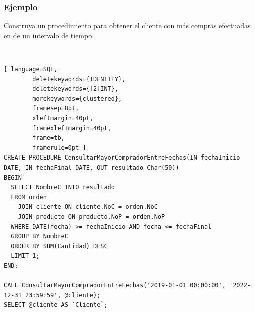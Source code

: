 \documentclass[
	10pt, %
	aspectratio=169, %
]{beamer}
\begin{document}
\begin{frame}[fragile]
	
	\frametitle{Ejemplo}
	
	Construya un procedimiento para obtener el cliente con más compras efectuadas en de un intervalo de tiempo.
	
	\ 
	
	
	\pause
	
	\begin{lstlisting}[ language=SQL,
		deletekeywords={IDENTITY},
		deletekeywords={[2]INT},
		morekeywords={clustered},
		framesep=8pt,
		xleftmargin=40pt,
		framexleftmargin=40pt,
		frame=tb,
		framerule=0pt ]
CREATE PROCEDURE ConsultarMayorCompradorEntreFechas(IN fechaInicio DATE, IN fechaFinal DATE, OUT resultado Char(50))
BEGIN
  SELECT NombreC INTO resultado 
  FROM orden 
    JOIN cliente ON cliente.NoC = orden.NoC
    JOIN producto ON producto.NoP = orden.NoP
  WHERE DATE(fecha) >= fechaInicio AND fecha <= fechaFinal 
  GROUP BY NombreC
  ORDER BY SUM(Cantidad) DESC
  LIMIT 1;
END;
		
CALL ConsultarMayorCompradorEntreFechas('2019-01-01 00:00:00', '2022-12-31 23:59:59', @cliente);
SELECT @cliente AS `Cliente`;
\end{lstlisting}
	
\end{frame}

\end{document}
